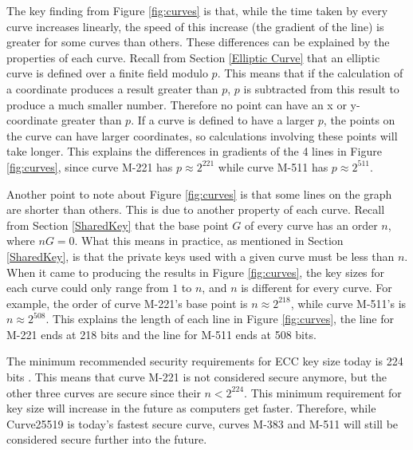 \documentclass[12pt,a4paper]{article}
\begin{document}
The key finding from Figure \ref{fig:curves} is that, while the time taken by every curve increases linearly, 
the speed of this increase (the gradient of the line) is greater for some curves than others. 
These differences can be explained by the properties of each curve. 
Recall from Section \ref{Elliptic Curve} that an elliptic curve is defined over a finite field modulo $p$. 
This means that if the calculation of a coordinate produces a result greater than $p$, $p$ is subtracted from this result to produce a much smaller number. 
Therefore no point can have an x or y-coordinate greater than $p$. 
If a curve is defined to have a larger $p$, the points on the curve can have larger coordinates, 
so calculations involving these points will take longer. 
This explains the differences in gradients of the 4 lines in Figure \ref{fig:curves}, 
since curve M-221 has $p \approx 2^{221}$ while curve M-511 has $p \approx 2^{511}$. 

Another point to note about Figure \ref{fig:curves} is that some lines on the graph are shorter than others. 
This is due to another property of each curve. 
Recall from Section \ref{SharedKey} that the base point $G$ of every curve has an order $n$, where $nG=0$. 
What this means in practice, as mentioned in Section \ref{SharedKey}, 
is that the private keys used with a given curve must be less than $n$. 
When it came to producing the results in Figure \ref{fig:curves}, the key sizes for each curve could only range from $1$ to $n$, 
and $n$ is different for every curve. 
For example, the order of curve M-221's base point is $n \approx 2^{218}$, while curve M-511's is $n \approx 2^{508}$. 
This explains the length of each line in Figure \ref{fig:curves}, the line for M-221 ends at 218 bits and the line for M-511 ends at 508 bits. 

The minimum recommended security requirements for ECC key size today is 224 bits \cite[p54-55]{barker2020recommendation}. 
This means that curve M-221 is not considered secure anymore, but the other three curves are secure since their $n < 2^{224}$. 
This minimum requirement for key size will increase in the future as computers get faster. 
Therefore, while Curve25519 is today's fastest secure curve, 
curves M-383 and M-511 will still be considered secure further into the future. 
\end{document}
